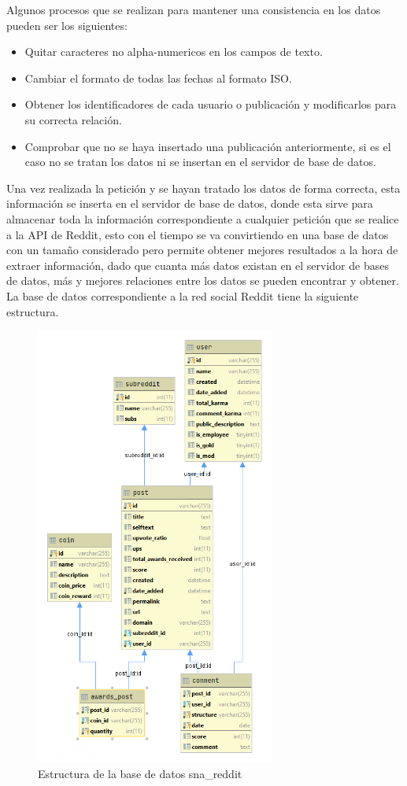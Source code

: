 \documentclass[../../main.tex]{subfiles}
\begin{document}
Algunos procesos que se realizan para mantener una consistencia en los datos pueden ser los siguientes: 
\begin{itemize}
    \item Quitar caracteres no alpha-numericos en los campos de texto.
    \item Cambiar el formato de todas las fechas al formato ISO.
    \item Obtener los identificadores de cada usuario o publicación y modificarlos para su correcta relación.
    \item Comprobar que no se haya insertado una publicación anteriormente, si es el caso no se tratan los datos ni se insertan en el servidor de base de datos.
\end{itemize}

Una vez realizada la petición y se hayan tratado los datos de forma correcta, esta información se inserta en el servidor de base de datos, donde esta sirve para almacenar toda la información correspondiente a cualquier petición que se realice a la API de Reddit, esto con el tiempo se va convirtiendo en una base de datos con un tamaño considerado pero permite obtener mejores resultados a la hora de extraer información, dado que cuanta más datos existan en el servidor de bases de datos, más y mejores relaciones entre los datos se pueden encontrar y obtener.  \\

La base de datos correspondiente a la red social Reddit tiene la siguiente estructura.\\

\begin{figure}[]
\centering
\includegraphics[width=0.7\textwidth]{images/4_sistema/sna_reddit.png}
\caption{Estructura de la base de datos sna\_reddit}
\end{figure}
\end{document}
